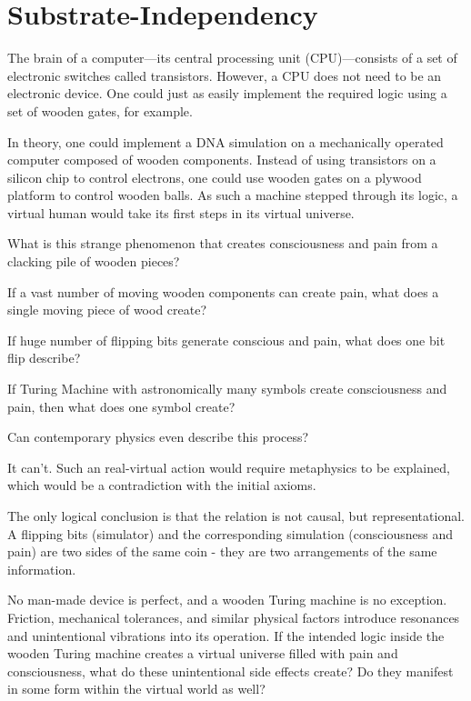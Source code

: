\chapter{Substrate-Independency}

\label{chap:woodensimulation}

The brain of a computer---its central processing unit (CPU)---consists of a set of electronic switches called transistors.
However, a CPU does not need to be an electronic device. One could just as easily implement the required logic using a set of wooden gates, for example.

In theory, one could implement a DNA simulation on a mechanically operated computer composed of wooden components.
Instead of using transistors on a silicon chip to control electrons, one could use wooden gates on a plywood platform to control wooden balls.
As such a machine stepped through its logic, a virtual human would take its first steps in its virtual universe.

What is this strange phenomenon that creates consciousness and pain from a clacking pile of wooden pieces?

If a vast number of moving wooden components can create pain, what does a single moving piece of wood create? 

If huge number of flipping bits generate conscious and pain, what does one bit flip describe?

If Turing Machine with astronomically many symbols create consciousness and pain, then what does one symbol create?

Can contemporary physics even describe this process?

It can't. Such an real-virtual action would require metaphysics to be explained, which would be a contradiction 
with the initial axioms.

The only logical conclusion is that the relation is not causal, but representational. A flipping bits (simulator) and the corresponding simulation
(consciousness and pain) are two sides of the same coin - they are two arrangements  of the same information.




No man-made device is perfect, and a wooden Turing machine is no exception. Friction, mechanical tolerances, and similar physical factors introduce resonances and unintentional vibrations into its operation. If the intended logic inside the wooden Turing machine creates a virtual universe filled with pain and consciousness, what do these unintentional side effects create? Do they manifest in some form within the virtual world as well?

